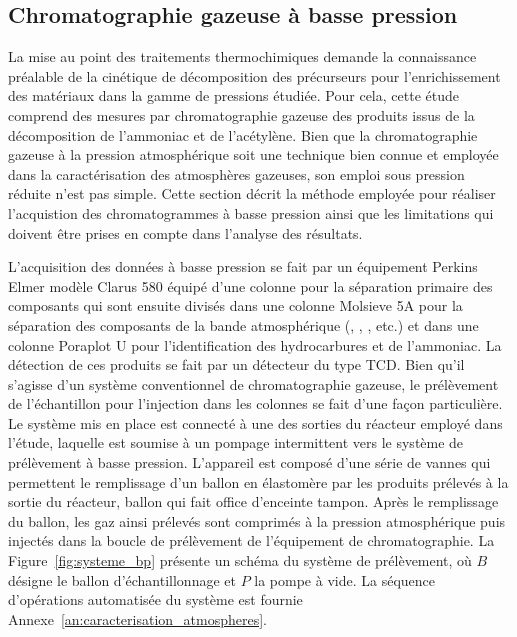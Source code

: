 \subsection{Chromatographie gazeuse à basse pression}
\label{sec:chromatographie_bp}

La mise au point des traitements thermochimiques demande la connaissance préalable de la cinétique de décomposition des précurseurs pour l'enrichissement des matériaux dans la gamme de pressions étudiée. Pour cela, cette étude comprend des mesures par chromatographie gazeuse des produits issus de la décomposition de l'ammoniac et de l'acétylène. Bien que la chromatographie gazeuse à la pression atmosphérique soit une technique bien connue et employée dans la caractérisation des atmosphères gazeuses, son emploi sous pression réduite n'est pas simple. Cette section décrit la méthode employée pour réaliser l'acquistion des chromatogrammes à basse pression ainsi que les limitations qui doivent être prises en compte dans l'analyse des résultats.

L'acquisition des données à basse pression se fait par un équipement Perkins Elmer modèle Clarus 580 équipé d'une colonne pour la séparation primaire des composants qui sont ensuite divisés dans une colonne Molsieve 5A pour la séparation des composants de la bande atmosphérique (, , , etc.) et dans une colonne Poraplot U pour l'identification des hydrocarbures et de l'ammoniac. La détection de ces produits se fait par un détecteur du type TCD. Bien qu'il s'agisse d'un système conventionnel de chromatographie gazeuse, le prélèvement de l'échantillon pour l'injection dans les colonnes se fait d'une façon particulière. Le système mis en place est connecté à une des sorties du réacteur employé dans l'étude, laquelle est soumise à un pompage intermittent vers le système de prélèvement à basse pression. L'appareil est composé d'une série de vannes qui permettent le remplissage d'un ballon en élastomère par les produits prélevés à la sortie du réacteur, ballon qui fait office d'enceinte tampon. Après le remplissage du ballon, les gaz ainsi prélevés sont comprimés à la pression atmosphérique puis injectés dans la boucle de prélèvement de l'équipement de chromatographie. La Figure~\ref{fig:systeme_bp} présente un schéma du système de prélèvement, où \og{}$B$\fg{} désigne le ballon d'échantillonnage et \og{}$P$\fg{} la pompe à vide. La séquence d'opérations automatisée du système est fournie Annexe~\ref{an:caracterisation_atmospheres}. %

